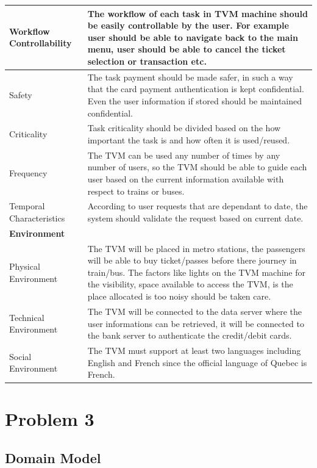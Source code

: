 \documentclass[a4paper,12pt]{report}
\begin{document}
\setlength{\tabcolsep}{18pt}
\renewcommand{\arraystretch}{1.5}
\begin{tabular}{ |p{3cm}|p{12cm}| }
	\hline
	Workflow Controllability & The workflow of each task in TVM machine should be easily controllable by the user. For example user should be able to navigate back to the main menu, user should be able to cancel the ticket selection or transaction etc.\\
	\hline
	Safety & 
	The task payment should be made safer, in such a way that the card payment authentication is kept confidential. Even the user information if stored should be maintained confidential.\\
	\hline
	Criticality & 
	Task criticality should be divided based on the how important the task is and how often it is used/reused.\\
	\hline
	Frequency & 
	The TVM can be used any number of times by any number of users, so the TVM should be able to guide each user based on the current information available with respect to trains or buses.\\
	\hline
	Temporal Characteristics & 
	According to user requests that are dependant to date, the system should validate the request based on current date. \\
	
	\hline
	\textbf{Environment} & \\
	\hline
	Physical Environment & 
	The TVM will be placed in metro stations, the passengers will be able to buy ticket/passes before there journey in train/bus. The factors like lights on the TVM machine for the visibility, space available to access the TVM, is the place allocated is too noisy should be taken care. \\
	\hline
	Technical Environment & 
	The TVM will be connected to the data server where the user informations can be retrieved, it will be connected to the bank server to authenticate the credit/debit cards. \\
	\hline
	Social Environment & 
	The TVM must support at least two languages including English and French since the official language of Quebec is French. \\
	\hline
\end{tabular}




\section{Problem 3}
\subsection{Domain Model}
\end{document}
